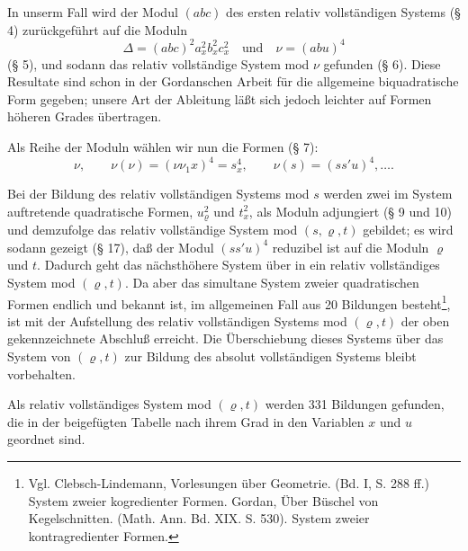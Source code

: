 \documentclass[11pt]{article}
\begin{document}
In unserm Fall wird der Modul $(abc)$ des ersten relativ vollständigen Systems (§ 4) zurückgeführt auf die Moduln
\[
\Delta=(abc)^2a_x^2b_x^2c_x^2\quad\text{und}\quad \nu=(abu)^4
\]
(§ 5), und sodann das relativ vollständige System mod $\nu$ gefunden (§ 6). Diese Resultate sind schon in der Gordanschen Arbeit für die allgemeine biquadratische Form gegeben; unsere Art der Ableitung läßt sich jedoch leichter auf Formen höheren Grades übertragen.

Als Reihe der Moduln wählen wir nun die Formen (§ 7):
\[
\nu,\qquad \nu(\nu)=(\nu\nu_1x)^4=s_x^4,\qquad \nu(s)=(ss'u)^4,\ldots .
\]

Bei der Bildung des relativ vollständigen Systems mod $s$ werden zwei im System auftretende quadratische Formen, $u_\varrho^2$ und $t_x^2$, als Moduln adjungiert (§ 9 und 10) und demzufolge das relativ vollständige System mod $(s,\varrho,t)$ gebildet; es wird sodann gezeigt (§ 17), daß der Modul $(ss'u)^4$ reduzibel ist auf die Moduln $\varrho$ und $t$. Dadurch geht das nächsthöhere System über in ein relativ vollständiges System mod $(\varrho,t)$. Da aber das simultane System zweier quadratischen Formen endlich und bekannt ist, im allgemeinen Fall aus 20 Bildungen besteht\footnote{Vgl. Clebsch-Lindemann, Vorlesungen über Geometrie. (Bd. I, S. 288 ff.) System zweier kogredienter Formen. Gordan, Über Büschel von Kegelschnitten. (Math. Ann. Bd. XIX. S. 530). System zweier kontragredienter Formen.}, ist mit der Aufstellung des relativ vollständigen Systems mod $(\varrho,t)$ der oben gekennzeichnete Abschluß erreicht. Die Überschiebung dieses Systems über das System von $(\varrho,t)$ zur Bildung des absolut vollständigen Systems bleibt vorbehalten.

Als relativ vollständiges System mod $(\varrho,t)$ werden 331 Bildungen gefunden, die in der beigefügten Tabelle nach ihrem Grad in den Variablen $x$ und $u$ geordnet sind.
\end{document}
